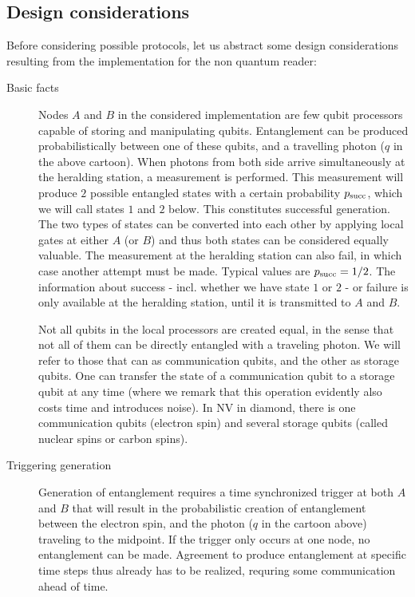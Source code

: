 \documentclass{article}
\begin{document}
\subsection{Design considerations}
Before considering possible protocols, let us abstract some design considerations resulting from the implementation for the non quantum reader:
\begin{description}
\item[Basic facts]
Nodes $A$ and $B$ in the considered implementation are few qubit processors capable of storing and manipulating qubits.
Entanglement can be produced probabilistically between one of these qubits, and a travelling photon ($q$ in the above cartoon).
When photons from both side arrive simultaneously at the heralding station, a measurement is performed. This measurement will produce $2$ possible
entangled states with a certain probability $p_{\rm succ}$, which we will call states $1$ and $2$ below. This constitutes successful generation. 
The two types of states can be converted into each other by applying local gates at either $A$ (or $B$) and thus both states can be considered equally valuable. The 
measurement at the heralding station can also fail, in which case another attempt must be made. Typical values are $p_{\rm succ} = 1/2$. 
The information about success - incl. whether we have state $1$ or $2$ - or failure is only available at the heralding station, until it is transmitted
to $A$ and $B$.

Not all qubits in the local processors are created equal, in the sense that not all of them can be directly entangled with a traveling photon. We will refer to those that can
as communication qubits, and the other as storage qubits. One can transfer the state of a communication qubit to a storage qubit at any time (where we remark that this operation evidently also costs time and introduces noise). In NV in diamond,
there is one communication qubits (electron spin) and several storage qubits (called nuclear spins or carbon spins).

\item[Triggering generation]
Generation of entanglement requires a time synchronized trigger at both $A$ and $B$ that will result in the probabilistic 
creation of entanglement between the electron spin, and the photon ($q$ in the cartoon above) traveling to the midpoint.
If the trigger only occurs at one node, no entanglement can be made. Agreement to produce entanglement at specific time steps thus already has to be realized, requring some communication ahead of time.


\end{description}
\end{document}
